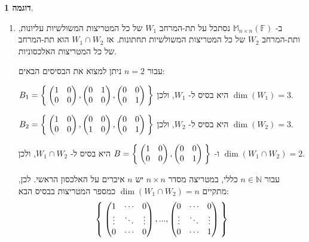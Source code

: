 \documentclass[12pt]{report}
\theoremstyle{plain}
\theoremstyle{definition}
\newtheorem{example}{דוגמה}[chapter]
\newcommand{\N}{\mathbb{N}}
\newcommand{\F}{\mathbb{F}}
\newcommand{\M}{\mathbb{M}}
\newcommand{\0}{\mathbf{0}}
\begin{document}
\begin{example}
\begin{enumerate}[label=\alph*.]
\item
ב-
$\M_{n\times n}(\F)$
נסתכל על תת-המרחב 
$W_1$
של כל המטריצות המשולשיות עליונות, ותת-המרחב
$W_2$
של כל המטריצות המשולשיות תחתונות. אז
$W_1\cap W_2$
הוא תת-המרחב של כל המטריצות האלכסוניות.

עבור 
$n=2$
ניתן למצוא את הבסיסים הבאים:

$B_1=\Set{\begin{pmatrix}
1 & 0 \\
0 & 0
\end{pmatrix},\begin{pmatrix}
0 & 1 \\
0 & 0
\end{pmatrix},\begin{pmatrix}
0 & 0 \\
0 & 1
\end{pmatrix}}$
היא בסיס ל-
$W_1$,
ולכן
$\dim(W_1)=3$.

$B_2=\Set{\begin{pmatrix}
1 & 0 \\
0 & 0
\end{pmatrix},\begin{pmatrix}
0 & 0 \\
1 & 0
\end{pmatrix},\begin{pmatrix}
0 & 0 \\
0 & 1
\end{pmatrix}}$
היא בסיס ל-
$W_2$,
ולכן
$\dim(W_2)=3$.

ו-
$B=\Set{\begin{pmatrix}
1 & 0 \\
0 & 0
\end{pmatrix},\begin{pmatrix}
0 & 0 \\
0 & 1
\end{pmatrix}}$
היא בסיס ל-
$W_1\cap W_2$,
ולכן
$\dim(W_1\cap W_2)=2$.

עבור
$n\in\N$
כללי,
במטריצה מסדר 
$n\times n$
יש 
$n$
איברים על האלכסון הראשי. לכן, מתקיים
$\dim(W_1\cap W_2)=n$
כמספר המטריצות בבסיס הבא:
$$
\Set{\begin{pmatrix}
1 & \cdots & 0 \\
\vdots & \ddots & \vdots \\
0 & \cdots & 0
\end{pmatrix},...,\begin{pmatrix}
0 & \cdots & 0 \\
\vdots & \ddots & \vdots \\
0 & \cdots & 1
\end{pmatrix}}
$$


\end{enumerate}
\end{example}
\end{document}
